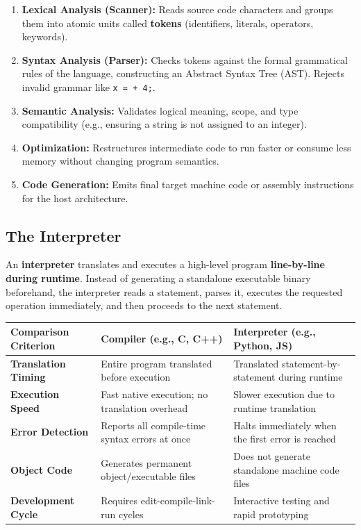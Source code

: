 \begin{definition}
\begin{enumerate}[leftmargin=1.2em]
    \item \textbf{Lexical Analysis (Scanner):} Reads source code characters and groups them into atomic units called \textbf{tokens} (identifiers, literals, operators, keywords).
    \item \textbf{Syntax Analysis (Parser):} Checks tokens against the formal grammatical rules of the language, constructing an Abstract Syntax Tree (AST). Rejects invalid grammar like \texttt{x = + 4;}.
    \item \textbf{Semantic Analysis:} Validates logical meaning, scope, and type compatibility (e.g., ensuring a string is not assigned to an integer).
    \item \textbf{Optimization:} Restructures intermediate code to run faster or consume less memory without changing program semantics.
    \item \textbf{Code Generation:} Emits final target machine code or assembly instructions for the host architecture.
\end{enumerate}
\end{definition}

\subsection{The Interpreter}
An \textbf{interpreter} translates and executes a high-level program \textbf{line-by-line during runtime}. Instead of generating a standalone executable binary beforehand, the interpreter reads a statement, parses it, executes the requested operation immediately, and then proceeds to the next statement.

\begin{center}
\small
\renewcommand{\arraystretch}{1.3}
\begin{tabularx}{\textwidth}{l X X}
\toprule
\textbf{Comparison Criterion} & \textbf{Compiler (e.g., C, C++)} & \textbf{Interpreter (e.g., Python, JS)} \\
\midrule
\textbf{Translation Timing} & Entire program translated before execution & Translated statement-by-statement during runtime \\
\textbf{Execution Speed} & Fast native execution; no translation overhead & Slower execution due to runtime translation \\
\textbf{Error Detection} & Reports all compile-time syntax errors at once & Halts immediately when the first error is reached \\
\textbf{Object Code} & Generates permanent object/executable files & Does not generate standalone machine code files \\
\textbf{Development Cycle} & Requires edit-compile-link-run cycles & Interactive testing and rapid prototyping \\
\bottomrule
\end{tabularx}
\end{center}


